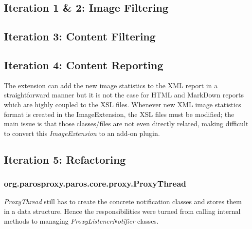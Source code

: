 \subsection{Iteration 1 \& 2: Image Filtering}
\subsection{Iteration 3: Content Filtering}
\subsection{Iteration 4: Content Reporting}
The extension can add the new image statistics to the XML report in a straightforward manner but it is not the case for HTML and MarkDown reports which are highly coupled to the XSL files. Whenever new XML image statistics format is created in the ImageExtension, the XSL files must be modified; the main issue is that those classes/files are not even directly related, making difficult to convert this \textit{ImageExtension} to an add-on plugin.

\subsection{Iteration 5: Refactoring}
\subsubsection{org.parosproxy.paros.core.proxy.ProxyThread}

\textit{ProxyThread} still has to create the concrete notification classes and stores them in a data structure. Hence the responsibilities were turned from calling internal methods to managing \textit{ProxyListenerNotifier} classes.
